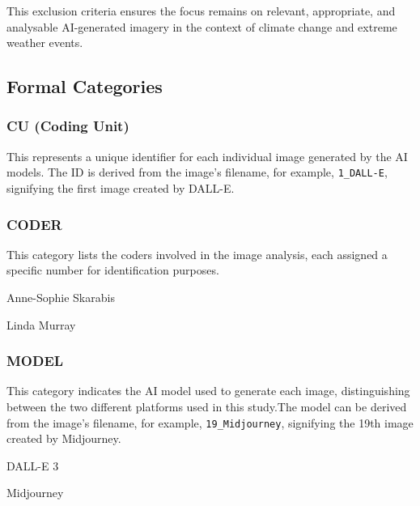 This exclusion criteria ensures the focus remains on relevant, appropriate, and analysable AI-generated imagery in the context of climate change and extreme weather events.

\subsection{Formal Categories}
 \subsubsection*{CU (Coding Unit)} 

 This represents a unique identifier for each individual image generated by the AI models. The ID is derived from the image's filename, for example, \texttt{1\_DALL-E}, signifying the first image created by DALL-E.
 
 \subsubsection*{CODER} 

 This category lists the coders involved in the image analysis, each assigned a specific number for identification purposes.
\begin{description}[leftmargin=2.5cm, style=multiline, labelwidth=1.5cm]
\item[1] Anne-Sophie Skarabis
\item[2] Linda Murray
\end{description}

 \subsubsection*{MODEL} 

 This category indicates the AI model used to generate each image, distinguishing between the two different platforms used in this study.The model can be derived from the image's filename, for example, \texttt{19\_Midjourney}, signifying the 19th image created by Midjourney.

\begin{description}[leftmargin=2.5cm, style=multiline, labelwidth=1.5cm]
\item[1] DALL-E 3
\item[2] Midjourney
\end{description}

